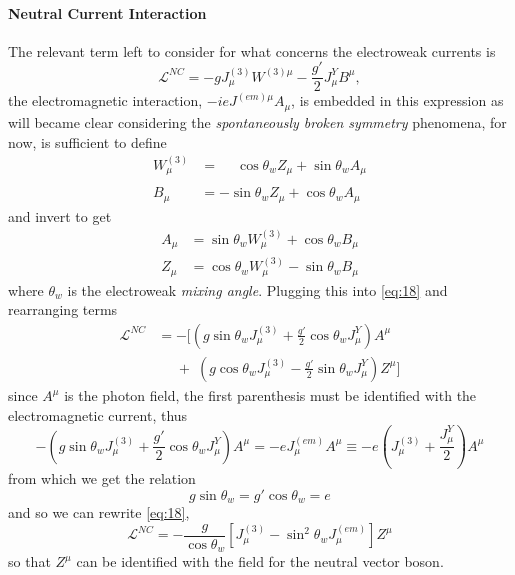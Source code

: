 \paragraph{Neutral Current Interaction}
\label{sec:neutr-curr-inter}
The relevant term left to consider for what concerns the electroweak currents is
\begin{equation}
  \label{eq:18}
  \mathcal{L}^{NC} = -g J_{\mu}^{(3)} W^{(3) \mu} - \frac{g'}{2}
  J_{\mu}^{Y} B^{\mu},
\end{equation}
the electromagnetic interaction, $-i e J^{(em) \mu} A_{\mu}$, is embedded in
this expression as will became clear considering the \emph{spontaneously broken
  symmetry} phenomena, for now, is sufficient to define
\begin{equation}
  \label{eq:19}
  \begin{split}
    W^{(3)}_{\mu} &= \phantom{-} \cos \theta_{w} Z_{\mu} + \sin \theta_{w}
    A_{\mu}
    \\
    B^{\phantom{(3)}}_{\mu} &= - \sin \theta_{w} Z_{\mu} + \cos \theta_{w}
    A_{\mu}
  \end{split}
\end{equation}
and invert to get
\begin{equation}
  \label{eq:20}
  \begin{split}
    A_{\mu} &= \sin \theta_{w} W_{\mu}^{(3)} + \cos \theta_{w} B_{\mu}
    \\
    Z_{\mu} &= \cos \theta_{w} W_{\mu}^{(3)} - \sin \theta_{w} B_{\mu}
  \end{split}
\end{equation}
where $\theta_{w}$ is the electroweak \emph{mixing angle}. Plugging this into
\eqref{eq:18} and rearranging terms
\begin{equation}
  \label{eq:21}
  \begin{split}
    \mathcal{L}^{NC} &= -[(g \sin \theta_{w} J_{\mu}^{(3)} +
    \frac{g'}{2} \cos \theta_{w} J_{\mu}^{Y} ) A^{\mu} \\
    &\phantom{=} + \phantom{[}(g\cos \theta_{w} J_{\mu}^{(3)} - \frac{g'}{2}
    \sin \theta_{w} J_{\mu}^{Y}) Z^{\mu}]
  \end{split}
\end{equation}
since $A^{\mu}$ is the photon field, the first parenthesis must be identified
with the electromagnetic current, thus
\begin{equation}
  \label{eq:22}
  -(g \sin \theta_{w} J_{\mu}^{(3)} + \frac{g'}{2} \cos
  \theta_{w} J_{\mu}^{Y} ) A^{\mu} = - e J_{\mu}^{(em)} A^{\mu}
  \equiv - e ( J_{\mu}^{(3)} + \frac{J_{\mu}^{Y}}{2} ) A^{\mu}
\end{equation}
from which we get the relation
\begin{equation}
  \label{eq:23}
  g \sin \theta_{w} = g' \cos \theta_{w} = e
\end{equation}
and so we can rewrite \eqref{eq:18},
\begin{equation}
  \label{eq:24}
  \mathcal{L}^{NC} = - \frac{g}{\cos \theta_{w}} [J_{\mu}^{(3)} - \sin^{2} \theta_{w}
  J_{\mu}^{(em)}] Z^{\mu}
\end{equation}
so that $Z^{\mu}$ can be identified with the field for the neutral vector boson.

